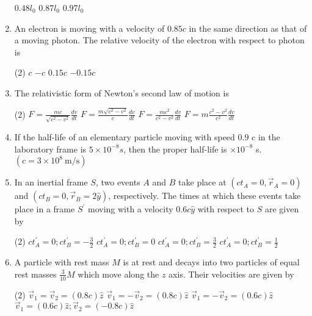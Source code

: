 \begin{enumerate}
\begin{tasks}
	\task[\textbf{B.}]$0.48 l_{0}$
	\task[\textbf{C.}]$0.87 l_{0}$
	\task[\textbf{D.}]$0.97 l_{0}$
\end{tasks}
	\item An electron is moving with a velocity of $0.85 c$ in the same direction as that of a moving photon. The relative velocity of the electron with respect to photon is
	{}
\begin{tasks}(2)
	\task[\textbf{A.}] $c$
	\task[\textbf{B.}]$-c$
	\task[\textbf{C.}] $0.15 c$
	\task[\textbf{D.}]$-0.15 c$
\end{tasks}
	\item  The relativistic form of Newton's second law of motion is 
	{}
\begin{tasks}(2)
	\task[\textbf{A.}] $F=\frac{m c}{\sqrt{c^{2}-v^{2}}} \frac{d v}{d t}$ 
	\task[\textbf{B.}]$F=\frac{m \sqrt{c^{2}-v^{2}}}{c} \frac{d v}{d t}$
	\task[\textbf{C.}]$F=\frac{m c^{2}}{c^{2}-v^{2}} \frac{d v}{d t}$
	\task[\textbf{D.}]$F=m \frac{c^{2}-v^{2}}{c^{2}} \frac{d v}{d t}$
\end{tasks}

	\item If the half-life of an elementary particle moving with speed $0.9$ c in the laboratory frame is $5 \times 10^{-8} s$, then the proper half-life is $\times 10^{-8}$ s. $\left(c=3 \times 10^{8} \mathrm{~m} / \mathrm{s}\right)$
	{}
	\item In an inertial frame $S$, two events $A$ and $B$ take place at $\left(c t_{A}=0, \vec{r}_{A}=0\right)$ and $\left(c t_{B}=0, \vec{r}_{B}=2 \hat{y}\right)$, respectively. The times at which these events take place in a frame $S^{\prime}$ moving with a velocity $0.6 c \hat{y}$ with respect to $S$ are given by
	{}

\begin{tasks}(2)
	\task[\textbf{A.}] $c t_{A}^{\prime}=0 ; c t_{B}^{\prime}=-\frac{3}{2}$
	\task[\textbf{B.}]$c t_{A}^{\prime}=0 ; c t_{B}^{\prime}=0$
	\task[\textbf{C.}]$c t_{A}^{\prime}=0 ; c t_{B}^{\prime}=\frac{3}{2}$
	\task[\textbf{D.}] $c t_{A}^{\prime}=0 ; c t_{B}^{\prime}=\frac{1}{2}$
\end{tasks}

	\item A particle with rest mass $M$ is at rest and decays into two particles of equal rest masses $\frac{3}{10} M$ which move along the $z$ axis. Their velocities are given by
	{}
\begin{tasks}(2)
	\task[\textbf{A.}] $\vec{v}_{1}=\vec{v}_{2}=(0.8 c) \hat{z}$
	\task[\textbf{B.}]$\vec{v}_{1}=-\vec{v}_{2}=(0.8 c) \hat{z}$
	\task[\textbf{C.}]$\vec{v}_{1}=-\vec{v}_{2}=(0.6 c) \hat{z}$
	\task[\textbf{D.}]$\vec{v}_{1}=(0.6 c) \hat{z} ; \vec{v}_{2}=(-0.8 c) \hat{z}$
\end{tasks}


\end{enumerate}
